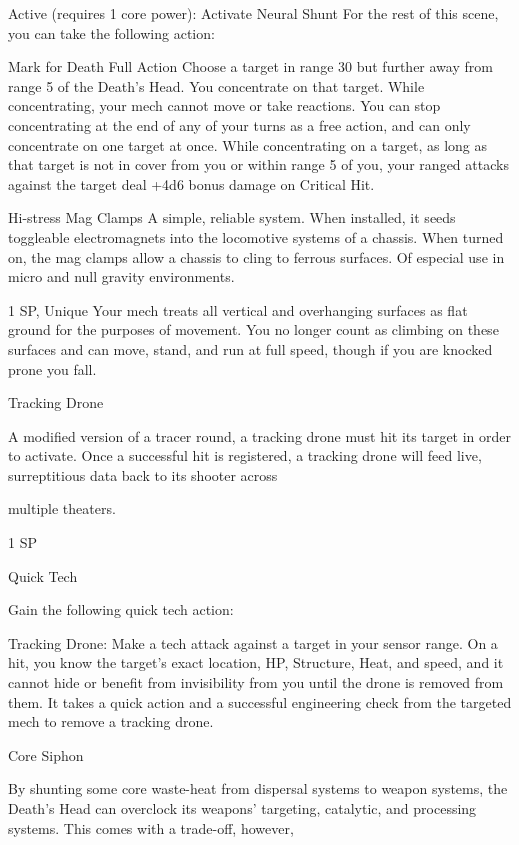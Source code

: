   Active (requires 1 core power): Activate Neural Shunt  
   For the rest of this scene, you can take the following action:  

  Mark for Death 
  Full Action 
   Choose a target in range 30 but further away from range 5 of the Death’s Head. You concentrate on that 
  target. While concentrating, your mech cannot move or take reactions. You can stop concentrating at 
  the end of any of your turns as a free action, and can only concentrate on one target at once. 
  While concentrating on a target, as long as that target is not in cover from you or within range 5 of you, 
  your ranged attacks against the target deal +4d6 bonus damage on Critical Hit. 

Hi-stress Mag Clamps  
A simple, reliable system. When installed, it seeds toggleable electromagnets into the locomotive systems  
of a chassis. When turned on, the mag clamps allow a chassis to cling to ferrous surfaces. Of especial use  
in micro and null gravity environments.  

1 SP, Unique  
Your mech treats all vertical and overhanging surfaces as flat ground for the purposes of  
movement. You no longer count as climbing on these surfaces and can move, stand, and run at  
full speed, though if you are knocked prone you fall.
 

Tracking Drone  

A modified version of a tracer round, a tracking drone must hit its target in order to activate. Once a  
successful hit is registered, a tracking drone will feed live, surreptitious data back to its shooter across  

multiple theaters.   

1 SP
 
Quick Tech
 
Gain the following quick tech action:
 
	        Tracking Drone: Make a tech attack against a target in your sensor range. On a hit, you  
know the target’s exact location, HP, Structure, Heat, and speed, and it cannot hide or benefit  
from invisibility from you until the drone is removed from them. It takes a quick action and a  
successful engineering check from the targeted mech to remove a tracking drone.
 

Core Siphon  

By shunting some core waste-heat from dispersal systems to weapon systems, the Death’s Head can  
overclock its weapons’ targeting, catalytic, and processing systems. This comes with a trade-off, however,  

